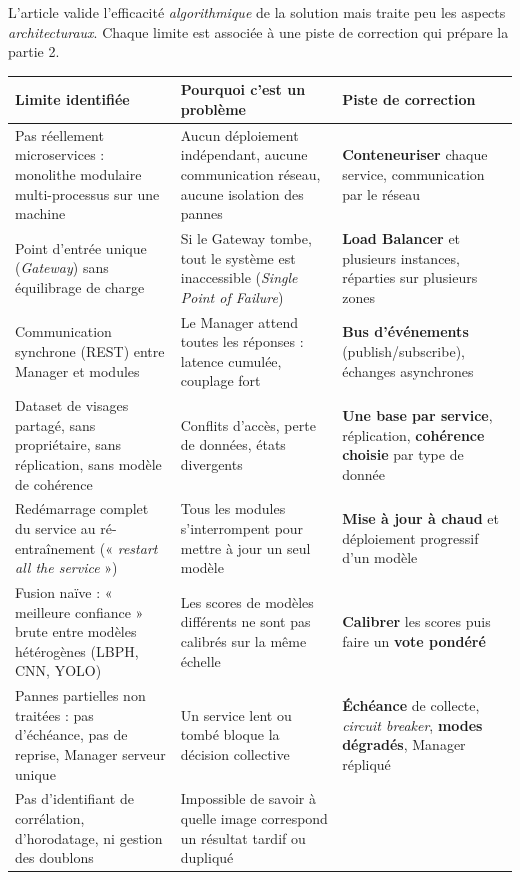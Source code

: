 \documentclass[11pt,a4paper]{article}
\begin{document}
L'article valide l'efficacité \emph{algorithmique} de la solution mais traite peu les aspects \emph{architecturaux}. Chaque limite est associée à une piste de correction qui prépare la partie 2.

\begin{table}[h]
\centering
\begin{tabular}{|p{4.6cm}|p{4.6cm}|p{4.6cm}|}
\hline
\textbf{Limite identifiée} & \textbf{Pourquoi c'est un problème} & \textbf{Piste de correction} \\
\hline
Pas réellement microservices : monolithe modulaire multi-processus sur une machine &
Aucun déploiement indépendant, aucune communication réseau, aucune isolation des pannes &
\textbf{Conteneuriser} chaque service, communication par le réseau \\
\hline
Point d'entrée unique (\textit{Gateway}) sans équilibrage de charge &
Si le Gateway tombe, tout le système est inaccessible (\textit{Single Point of Failure}) &
\textbf{Load Balancer} et plusieurs instances, réparties sur plusieurs zones \\
\hline
Communication synchrone (REST) entre Manager et modules &
Le Manager attend toutes les réponses : latence cumulée, couplage fort &
\textbf{Bus d'événements} (publish/subscribe), échanges asynchrones \\
\hline
Dataset de visages partagé, sans propriétaire, sans réplication, sans modèle de cohérence &
Conflits d'accès, perte de données, états divergents &
\textbf{Une base par service}, réplication, \textbf{cohérence choisie} par type de donnée \\
\hline
Redémarrage complet du service au ré-entraînement (« \textit{restart all the service} ») &
Tous les modules s'interrompent pour mettre à jour un seul modèle &
\textbf{Mise à jour à chaud} et déploiement progressif d'un modèle \\
\hline
Fusion naïve : « meilleure confiance » brute entre modèles hétérogènes (LBPH, CNN, YOLO) &
Les scores de modèles différents ne sont pas calibrés sur la même échelle &
\textbf{Calibrer} les scores puis faire un \textbf{vote pondéré} \\
\hline
Pannes partielles non traitées : pas d'échéance, pas de reprise, Manager serveur unique &
Un service lent ou tombé bloque la décision collective &
\textbf{Échéance} de collecte, \textit{circuit breaker}, \textbf{modes dégradés}, Manager répliqué \\
\hline
Pas d'identifiant de corrélation, d'horodatage, ni gestion des doublons &
Impossible de savoir à quelle image correspond un résultat tardif ou dupliqué &

\end{tabular}
\end{table}
\end{document}
